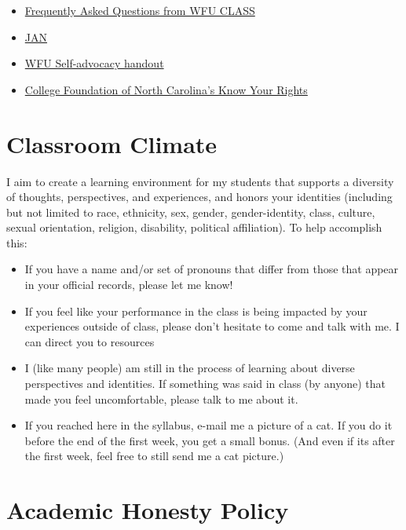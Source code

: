 \begin{itemize}
\tightlist
\item
  \href{https://class.wfu.edu/frequently-asked-questions-students/}{Frequently Asked Questions from WFU CLASS}
\item
  \href{https://askjan.org/}{JAN}
\item
  \href{https://docs.google.com/document/d/1X44zJyTz8-s9t6IXw0bII2DCFiOk1NR2MRfTi8wBiIc/}{WFU Self-advocacy handout}
\item
  \href{https://www.cfnc.org/plan-your-future/plan-for-college/students-with-disabilities/know-your-rights/}{College Foundation of North Carolina's Know Your Rights}
\end{itemize}

\hypertarget{classroom-climate}{%
\chapter{Classroom Climate}\label{classroom-climate}}

I aim to create a learning environment for my students that supports a diversity of thoughts, perspectives, and experiences, and honors your identities (including but not limited to race, ethnicity, sex, gender, gender-identity, class, culture, sexual orientation, religion, disability, political affiliation). To help accomplish this:

\begin{itemize}
\item
  If you have a name and/or set of pronouns that differ from those that appear in your official records, please let me know!
\item
  If you feel like your performance in the class is being impacted by your experiences outside of class, please don't hesitate to come and talk with me. I can direct you to resources
\item
  I (like many people) am still in the process of learning about diverse perspectives and identities. If something was said in class (by anyone) that made you feel uncomfortable, please talk to me about it.
\item
  If you reached here in the syllabus, e-mail me a picture of a cat. If you do it before the end of the first week, you get a small bonus. (And even if its after the first week, feel free to still send me a cat picture.)
\end{itemize}

\hypertarget{academic-honesty-policy}{%
\chapter{Academic Honesty Policy}\label{academic-honesty-policy}}


